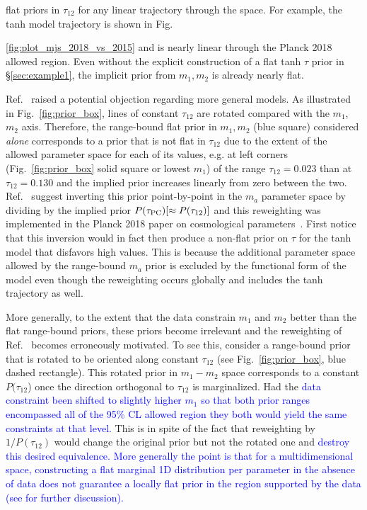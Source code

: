 \documentclass[prd,twocolumn,amsmath,amssymb,floatfix,superscriptaddress,nofootinbib]{revtex4-1}
\newcommand{\wh}[1]{\textcolor{blue}{#1}}
\begin{document}
flat priors in $\tau_{12}$ for any linear trajectory through the space.   For example, the tanh model trajectory is shown in Fig.~{\ref{fig:plot_mjs_2018_vs_2015} and is nearly linear through the Planck 2018 allowed region.  Even without the explicit 
construction of a flat tanh $\tau$ prior in \S \ref{sec:example1}, 
the implicit prior from $m_1,m_2$ is already nearly flat. 

Ref.~\cite{Millea:2018bko} raised a potential objection regarding more general models.  As illustrated in Fig.~\ref{fig:prior_box}, lines of constant $\tau_{12}$ are rotated compared with the $m_1$,
$m_2$ axis.  Therefore, the range-bound flat prior in $m_1,m_2$ (blue square) considered {\it alone} corresponds to a prior that is not flat in $\tau_{12}$ due to the extent  of the allowed parameter space
for each of its values, e.g. at  left corners (Fig.~\ref{fig:prior_box} solid square or lowest $m_1$) of the range $\tau_{12}=0.023$
than at $\tau_{12} = 0.130$ and the implied prior increases linearly from zero between the two.   Ref.~\cite{Millea:2018bko} suggest 
inverting this prior point-by-point in the $m_a$ parameter space by dividing by the implied prior $P(\tau_{\rm PC}) [ \approx P(\tau_{12})]$ and this reweighting was implemented in the Planck 2018 paper on cosmological parameters~\cite{Aghanim:2018eyx}.
First notice that this inversion would in fact then produce a non-flat prior on $\tau$ for the tanh model
that disfavors high values.   This is because
the additional parameter space allowed by the range-bound $m_a$ prior is excluded by the functional form of the model even though the reweighting occurs globally and includes the tanh trajectory as well. 

More generally, to the extent that the data constrain $m_1$ and $m_2$ better than the flat range-bound priors, these priors become irrelevant and the reweighting of Ref.~\cite{Millea:2018bko} becomes erroneously motivated.   To see this, consider a range-bound prior that is rotated to be oriented along constant $\tau_{12}$ (see Fig.~\ref{fig:prior_box}, blue dashed rectangle). This rotated prior in $m_1-m_2$ space corresponds to a constant $P(\tau_{12}$) once the direction orthogonal to $\tau_{12}$ is marginalized.
Had the  \wh{data constraint been shifted to slightly higher
$m_1$ so that both prior ranges encompassed all of the 95\% CL allowed
region they both would yield  the same constraints at that level.}
This is in spite of the fact that reweighting by $1/P(\tau_{12})$ would  change the original prior but not the
rotated one and \wh{destroy this desired equivalence.  More generally the point is that for a multidimensional space, constructing a flat marginal 1D distribution per parameter in the absence of data does not guarantee a locally flat prior in the region supported by the data
(see \cite{Heinrich:2018btc} for further discussion).}

}
\end{document}
